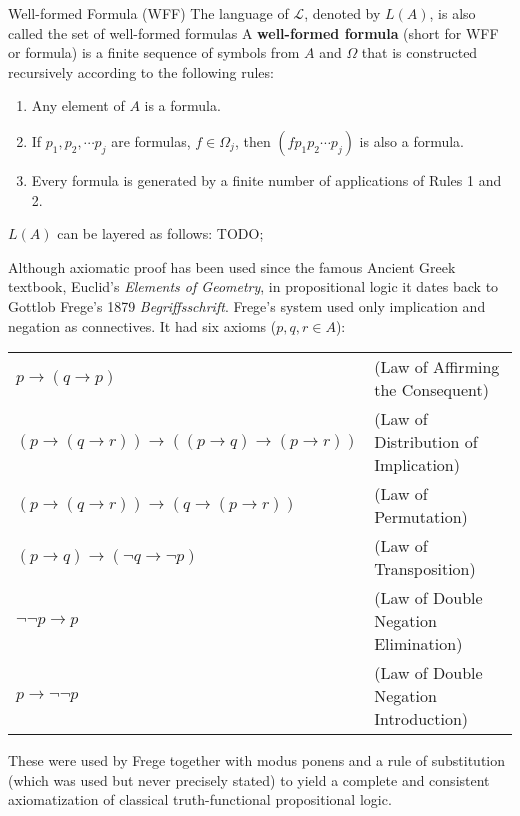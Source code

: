 \documentclass[11pt]{elegantbook}
\begin{document}
\begin{definition}{Well-formed Formula (WFF)}
    The language of \(\mathcal{L}\), denoted by \(L(A)\), is also called the set of well-formed formulas
    A \textbf{well-formed formula} (short for WFF or formula) is a finite sequence of symbols from \({A}\) and \({\Omega}\) 
    that is constructed recursively according to the following rules:
    \begin{enumerate}
        \item Any element of \({A}\) is a formula.
        \item If \(p_{1},p_{2},\cdots p_{j}\) are formulas, \(f\in \Omega_{j}\), then \((fp_{1}p_{2}\cdots p_{j})\) is also a formula.
        \item Every formula is generated by a finite number of applications of Rules 1 and 2.
    \end{enumerate}
\end{definition}
\(L(A)\) can be layered as follows:
TODO;


Although axiomatic proof has been used since the famous Ancient Greek textbook, Euclid's \textit{Elements of Geometry}, 
in propositional logic it dates back to Gottlob Frege's 1879 \textit{Begriffsschrift}.
Frege's system used only implication and negation as connectives.
It had six axioms (\(p,q,r\in A\)):

\begin{tabular}{@{}l l@{}}
$p \to (q \to p)$ & \quad (Law of Affirming the Consequent) \\
$(p \to (q \to r)) \to ((p \to q) \to (p \to r))$ & \quad (Law of Distribution of Implication) \\
\((p\to (q\to r))\to (q\to (p\to r))\) & \quad (Law of Permutation) \\
$(p \to q) \to (\neg q \to \neg p)$ & \quad (Law of Transposition) \\
\(\neg \neg p \to p\) & \quad (Law of Double Negation Elimination) \\
\(p \to \neg \neg p\) & \quad (Law of Double Negation Introduction) \\
\end{tabular}

These were used by Frege together with modus ponens and a rule of substitution (which was used but never precisely stated) 
to yield a complete and consistent axiomatization of classical truth-functional propositional logic.
\end{document}
